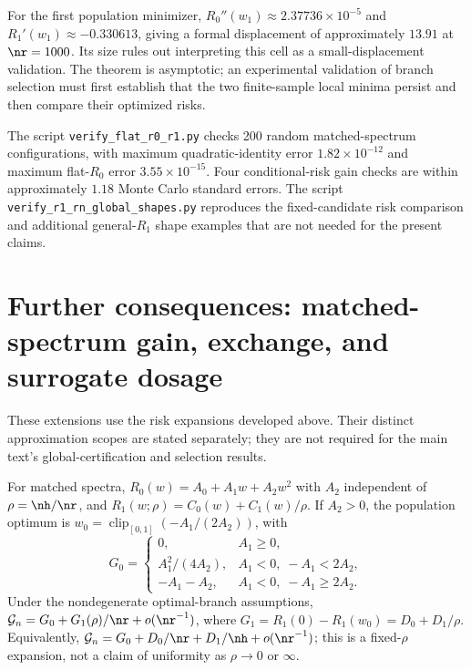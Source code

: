 For the first population minimizer, $R_0''(w_1)\approx2.37736\times10^{-5}$ and $R_1'(w_1)\approx-0.330613$, giving a formal displacement of approximately $13.91$ at $\nr=1000$. Its size rules out interpreting this cell as a small-displacement validation. The theorem is asymptotic; an experimental validation of branch selection must first establish that the two finite-sample local minima persist and then compare their optimized risks.

The script \texttt{verify\_flat\_r0\_r1.py} checks 200 random matched-spectrum configurations, with maximum quadratic-identity error $1.82\times10^{-12}$ and maximum flat-$R_0$ error $3.55\times10^{-15}$. Four conditional-risk gain checks are within approximately $1.18$ Monte Carlo standard errors. The script \texttt{verify\_r1\_rn\_global\_shapes.py} reproduces the fixed-candidate risk comparison and additional general-$R_1$ shape examples that are not needed for the present claims.

\section{Further consequences: matched-spectrum gain, exchange, and surrogate dosage}
\label{supp:doseexchange}

These extensions use the risk expansions developed above. Their distinct approximation scopes are stated separately; they are not required for the main text's global-certification and selection results.

For matched spectra, $R_0(w)=A_0+A_1w+A_2w^2$ with $A_2$ independent of $\rho=\nh/\nr$, and $R_1(w;\rho)=C_0(w)+C_1(w)/\rho$. If $A_2>0$, the population optimum is $w_0=\operatorname{clip}_{[0,1]}(-A_1/(2A_2))$, with
\begin{equation}
 G_0=\begin{cases}
 0,&A_1\ge0,\\
 A_1^2/(4A_2),&A_1<0,\;-A_1<2A_2,\\
 -A_1-A_2,&A_1<0,\;-A_1\ge2A_2.
 \end{cases}
\end{equation}
Under the nondegenerate optimal-branch assumptions, $\mathcal G_n=G_0+G_1(\rho)/\nr+o(\nr^{-1})$, where $G_1=R_1(0)-R_1(w_0)=D_0+D_1/\rho$. Equivalently, $\mathcal G_n=G_0+D_0/\nr+D_1/\nh+o(\nr^{-1})$; this is a fixed-$\rho$ expansion, not a claim of uniformity as $\rho\to0$ or $\infty$.

